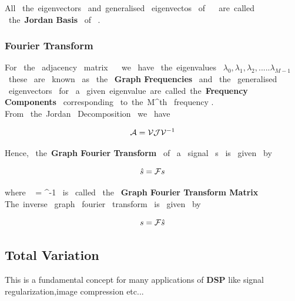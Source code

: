\documentclass[12pt,onecolumn]{article}
\begin{document}
All \ the\ eigenvectors \ and\ generalised \ eigenvectos \ of \  \ are\ called \ the\ \textbf{Jordan Basis} \ of \ . \\

\subsubsection{\textbf{Fourier Transform}}
For \ the \ adjacency \ matrix \  \ we \ have \ the\ eigenvalues \   $\lambda_{0},\lambda_{1},\lambda_{2},.....\lambda_{M-1} $ \ these \ are \ known \ as \ the \ \textbf{Graph Frequencies} \ and \ the \ generalised \ eigenvectors \ for \ a  \ given\ eigenvalue\ are\ called\ the\ \textbf{Frequency Components} \ corresponding \ to\  the\ M^{th} \ frequency .\\  
From \ the\ Jordan \ Decomposition \ we \ have

\begin{equation*}
\mathcal{A} = \mathcal{V} \mathcal{J} \mathcal{V}^{-1} \\   
\end{equation*}

Hence, \ the\ \textbf{Graph Fourier Transform} \  of \ a \ signal \ s \ is \ given \ by 

\begin{equation*}
    \hat{s} = \mathcal{F}s \\
\end{equation*}

where \  = ^{-1} \ is \ called \ the  \ \textbf{Graph Fourier Transform Matrix} \\
The\ inverse \ graph \ fourier \ transform \ is \ given \ by 

\begin{equation*}
    s = \mathcal{F} \hat{s} \\
\end{equation*}
\newline
\subsection{\textbf{Total Variation}}
This is a fundamental concept for many applications of \textbf{DSP} like signal regularization,image compression etc...\\
\end{document}
